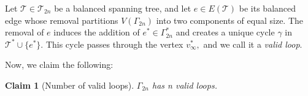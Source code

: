 \documentclass{amsart}
\newtheorem{claim}[theorem]{Claim}  \newtheorem{conjecture}[theorem]{Conjecture}
\theoremstyle{definition}
\newcommand{\yandi}[1]{\marginpar{\tiny \color{red} Yandi: #1}}
\newcommand{\saugat}[1]{\marginpar{\tiny \color{blue} Saugat: #1}}
\newcommand{\longnguyen}[1]
{\marginpar{\tiny \color{purple} Long: #1}}
\newcommand{\purple}[1]{\textcolor{purple}{#1}}
\begin{document}
    \par
     Let $\mathcal{T} \in \mathscr{T}_{2n}$ be a balanced spanning tree, and let $e \in E(\mathcal{T})$ be its balanced edge whose removal partitions $V(\Gamma_{2n})$ into two components of equal size. 
    The removal of $e$ induces the addition of $e^* \in \Gamma_{2n}^*$ and creates a unique cycle $\gamma$ in $\mathcal{T}^* \cup\{e^*\}.$ This cycle passes through the vertex $v_\infty^{\ast},$ and we call it a \emph{valid loop}.
 \par 
    Now, we claim the following: 

\begin{claim}[Number of valid loops]\label{claim:loops} $\Gamma_{2n}$ has n valid loops.
\end{claim}




\end{document}
